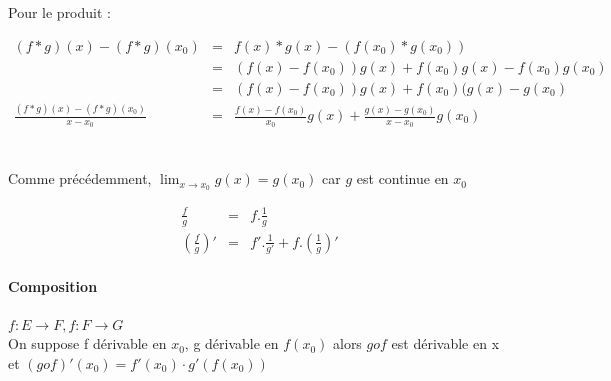 			Pour le produit :
			
			$\begin{array}{rcl}
				(f*g)(x) - (f*g)(x_0) &=& f(x)*g(x) - (f(x_0)*g(x_0)) \\
																							   &=& (f(x)-f(x_0))g(x) + f(x_0)g(x) - f(x_0)g(x_0) \\
																							   &=& (f(x)-f(x_0))g(x) + f(x_0)(g(x) -g(x_0) \\
				\frac{(f*g)(x)-(f*g)(x_0)}{x-x_0} &=& \frac{f(x) - f(x_0)}{x_0}g(x) + \frac{g(x) - g(x_0)}{x-x_0}g(x_0)
			\end{array}$
			~\\
			~\\
			Comme précédemment, $\lim_{x \to x_0}{g(x)} = g(x_0)$ car $g$ est continue en $x_0$

			\[\begin{array}{rcl}
					\frac{f}{g} &=& f . \frac{1}{g} \\
					(\frac{f}{g})' &=& f'.\frac{1}{g'} + f.(\frac{1}{g})'
				\end{array}
			\]

			\paragraph{Composition} $f:E \rightarrow F, f : F \rightarrow G$ ~\\
			On suppose f dérivable en $x_0$, g dérivable en $f(x_0)$ alors $gof$ est dérivable en x et $(gof)'(x_0) = f'(x_0)\cdot g'(f(x_0))$
